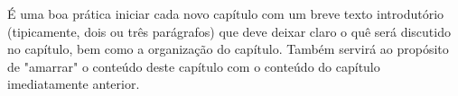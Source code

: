 

É uma boa prática iniciar cada novo capítulo com um breve texto introdutório (tipicamente, dois ou três parágrafos) que deve deixar claro o quê será discutido no capítulo, bem como a organização do capítulo.
Também servirá ao propósito de "amarrar"{} o conteúdo deste capítulo com o conteúdo do capítulo imediatamente anterior.
